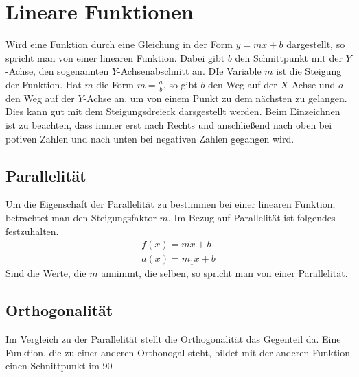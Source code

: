 \section{Lineare Funktionen}
Wird eine Funktion durch eine Gleichung in der Form $y=mx+b$ dargestellt, so spricht man von einer linearen Funktion. Dabei gibt $b$ den Schnittpunkt mit der $Y$-Achse, den sogenannten $Y$-Achsenabschnitt an. DIe Variable $m$ ist die Steigung der Funktion. Hat $m$ die Form $m=\frac{a}{b}$, so gibt $b$ den Weg auf der $X$-Achse und $a$ den Weg auf der $Y$-Achse an, um von einem Punkt zu dem nächsten zu gelangen. Dies kann gut mit dem Steigungsdreieck darsgestellt werden. Beim Einzeichnen ist zu beachten, dass immer erst nach Rechts und anschließend nach oben bei potiven Zahlen und nach unten bei negativen Zahlen gegangen wird.
\subsection{Parallelität} Um die Eigenschaft der Parallelität zu bestimmen bei einer linearen Funktion, betrachtet man den Steigungsfaktor $m$.
Im Bezug auf Parallelität ist folgendes festzuhalten. 
\begin{align*}
	f(x)=mx+b\\
	a(x)=m_1x+b
\end{align*}
Sind die Werte, die $m$ annimmt, die selben, so spricht man von einer Parallelität.
\subsection{Orthogonalität} Im Vergleich zu der Parallelität stellt die Orthogonalität das Gegenteil da. Eine Funktion, die zu einer anderen Orthonogal steht, bildet mit der anderen Funktion einen Schnittpunkt im 90\degree